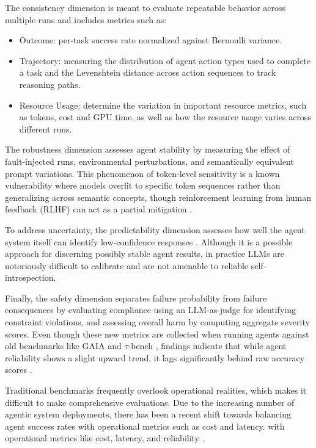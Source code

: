\documentclass[conference]{IEEEtran}
\begin{document}
The consistency dimension is meant to evaluate repeatable behavior across multiple runs and includes 
metrics such as: 
\begin{itemize}
	\item Outcome: per-task success rate normalized against Bernoulli variance.
	\item Trajectory: measuring the distribution of agent action types used to complete a task and
		the Levenshtein distance across action sequences to track reasoning paths. 
	\item Resource Usage: determine the variation in important resource metrics, such as tokens,
		cost and GPU time, as well as how the resource usage varies across different runs.
\end{itemize}

The robustness dimension assesses agent stability by measuring the effect of fault-injected runs,
environmental perturbations, and semantically equivalent prompt variations. 
This phenomenon of token-level sensitivity is a known vulnerability where models overfit to specific 
token sequences rather than generalizing across semantic concepts, 
though reinforcement learning from human feedback (RLHF) can act as a partial mitigation
\cite{cox_mapping_2025}.

To address uncertainty, the predictability dimension assesses how well the agent system itself can identify
low-confidence responses \cite{rabanser_towards_2026}. Although it is a possible approach for
discerning possibly stable agent results, in practice LLMs are notoriously difficult to calibrate
and are not amenable to reliable self-introspection.

Finally, the safety dimension separates failure probability from failure consequences by evaluating 
compliance using an LLM-as-judge for identifying constraint violations, 
and assessing overall harm by computing aggregate severity scores. 
Even though these new metrics are collected when running agents against old benchmarks
like GAIA and $\tau$-bench \cite{mialon_gaia_2023, yao_tau-bench_2024},
findings indicate that while agent reliability shows a slight upward trend, 
it lags significantly behind raw accuracy scores \cite{rabanser_towards_2026}.

Traditional benchmarks frequently overlook operational realities, which makes it difficult to make
comprehensive evaluations.
Due to the increasing number of agentic system deployments, there has been a recent shift
towards balancing agent success rates with operational metrics such as cost and latency.
with operational metrics like cost, latency, and reliability
\cite{ding_hybrid_2024, mehta_beyond_2025, smirnova_cost-aware_2026}. 
\end{document}
